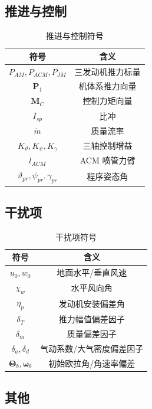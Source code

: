 \begin{thesisappendix}
\subsection{推进与控制}

\begin{table}[H]
\caption{推进与控制符号}
\label{tab:sym_prop}
\begin{tabularx}{\textwidth}{>{\hsize}C >{\hsize}C}
\toprule
符号 & 含义 \\
\midrule
$P_{AM},P_{ACM},P_{JM}$ & 三发动机推力标量 \\
$\mathbf P_1$ & 机体系推力向量 \\
$\mathbf M_C$ & 控制力矩向量 \\
$I_{sp}$ & 比冲 \\
$\dot m$ & 质量流率 \\
$K_\vartheta,K_\psi,K_\gamma$ & 三轴控制增益 \\
$l_{ACM}$ & ACM 喷管力臂 \\
$\vartheta_{pr},\psi_{pr},\gamma_{pr}$ & 程序姿态角 \\
\bottomrule
\end{tabularx}
\end{table}

\subsection{干扰项}

\begin{table}[H]
\caption{干扰项符号}
\label{tab:sym_disturb}
\begin{tabularx}{\textwidth}{>{\hsize}C >{\hsize}C}
\toprule
符号 & 含义 \\
\midrule
$u_0,w_0$ & 地面水平/垂直风速 \\
$\chi_w$ & 水平风向角 \\
$\eta_p$ & 发动机安装偏差角 \\
$\delta_T$ & 推力幅值偏差因子 \\
$\delta_m$ & 质量偏差因子 \\
$\delta_a,\delta_d$ & 气动系数/大气密度偏差因子 \\
$\boldsymbol\Theta_b,\boldsymbol\omega_b$ & 初始欧拉角/角速率偏差 \\
\bottomrule
\end{tabularx}
\end{table}

\subsection{其他}


\end{thesisappendix}

